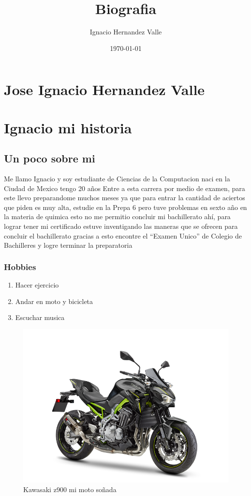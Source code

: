 \documentclass{book}
\author{Ignacio Hernandez Valle}
\title{Biografia}
\date{\today}
\begin{document}
\maketitle

\listoffigures
{}


\chapter*{Jose Ignacio Hernandez Valle}


\chapter{Ignacio mi historia}
\section{Un poco sobre mi}

Me llamo Ignacio y soy estudiante de Ciencias de la Computacion naci en la Ciudad de Mexico tengo 20 años
Entre a esta carrera por medio de examen, para este llevo preparandome muchos meses ya que para entrar la cantidad de aciertos que piden es muy alta, estudie en la Prepa 6 pero tuve problemas en sexto año en la materia de quimica esto no me permitio concluir mi bachillerato ahí, para lograr tener mi certificado estuve inventigando las maneras que se ofrecen para concluir el bachillerato gracias a esto encontre el ``Examen Unico'' de Colegio de Bachilleres y logre terminar la preparatoria

\subsection{Hobbies}
\begin{enumerate}
  
\item Hacer ejercicio
\item Andar en moto y bicicleta
\item Escuchar musica
\end{enumerate}

\begin{figure}[h]
  \centering
  \includegraphics[scale=0.5]{IMG/8_1.png}
  \caption{\small Kawasaki z900 mi moto soñada} \label{fig:8_1}
\end{figure}
\end{document}
